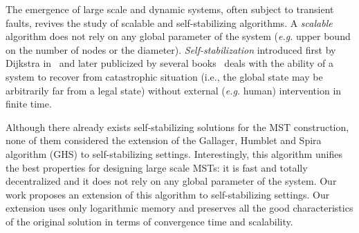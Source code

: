 \documentclass[11pt,a4paper]{article}
\begin{document}
The emergence of large scale and dynamic systems, often subject to transient faults, revives the study of scalable and self-stabilizing algorithms.
A \emph{scalable} algorithm does not rely on any global parameter of the system (\emph{e.g.} upper bound on the  number of nodes or the diameter). 
\emph{Self-stabilization} introduced first by Dijkstra in~\cite{D74j} and later publicized by several books~\cite{Dolev00,Tel94} deals 
with the ability of a system to recover from catastrophic situation (i.e., the global state may be arbitrarily far from a legal state)
without external (\emph{e.g.} human) intervention in finite time.


Although there already exists self-stabilizing solutions for the MST construction, none of them considered the extension of   
the Gallager, Humblet and Spira algorithm (GHS) to self-stabilizing settings.  
Interestingly, this algorithm unifies the best properties for designing large scale 
MSTs: it is fast and totally decentralized and it does not 
rely on any global parameter of the system. Our work proposes an extension of this algorithm to self-stabilizing settings. Our extension uses only logarithmic memory and  
preserves all the good characteristics of the original solution in terms of 
convergence time and scalability. 
\end{document}
